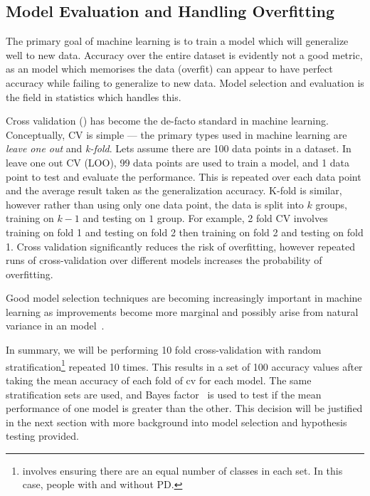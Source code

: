 \documentclass[12pt, twoside]{book}
\renewcommand\emph[1]{\textit{\color{USred}{#1}}}
\begin{document}
\subsection{Model Evaluation and Handling Overfitting}
\label{detectoverfit}
The primary goal of machine learning is to train a model which will generalize well to new data. Accuracy over the entire dataset is evidently not a good metric, as an model which memorises the data (overfit) can appear to have perfect accuracy while failing to generalize to new data. Model selection and evaluation is the field in statistics which handles this. 

Cross validation (\emph{CV}) has become the de-facto standard in machine learning. Conceptually, CV is simple --- the primary types used in machine learning are \textit{leave one out} and \textit{k-fold}. Lets assume there are 100 data points in a dataset. In leave one out CV (LOO), 99 data points are used to train a model, and 1 data point to test and evaluate the performance. This is repeated over each  data point and the average result taken as the generalization accuracy. K-fold is similar, however rather than using only one data point, the data is split into $k$ groups, training on $k-1$ and testing on $1$ group. For example, 2 fold CV involves training on fold 1 and testing on fold 2 then training on fold 2 and testing on fold 1. Cross validation significantly reduces the risk of overfitting, however repeated runs of cross-validation over different models increases the probability of overfitting.



\begin{highlight}
	Good model selection techniques are becoming increasingly important in machine learning as improvements become more marginal and possibly arise from natural variance in an model~\cite{overfittingcv}.
\end{highlight} 



In summary, we will be performing 10 fold cross-validation with random stratification\footnote{\emph{Stratification} involves ensuring there are an equal number of classes in each set. In this case, people with and without PD. } repeated 10 times. This results in a set of 100 accuracy values after taking the mean accuracy of each fold of cv for each model. The same stratification sets are used, and Bayes factor~\cite{bayesianttests} is used to test if the mean performance of one model is greater than the other. This decision will be justified in the next section with more background into model selection and hypothesis testing provided.
\end{document}
